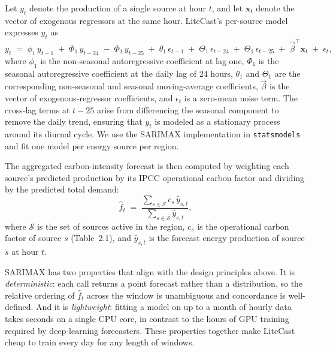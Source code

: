 Let $y_t$ denote the production of a single source at hour $t$, and let $\mathbf{x}_t$ denote the vector of exogenous regressors at the same hour.
LiteCast's per-source model expresses $y_t$ as
\begin{equation}
    y_t \;=\; \phi_1 \, y_{t-1} \;+\; \Phi_1 \, y_{t-24} \;-\; \Phi_1 \, y_{t-25} \;+\; \theta_1 \, \epsilon_{t-1} \;+\; \Theta_1 \, \epsilon_{t-24} \;+\; \Theta_1 \, \epsilon_{t-25} \;+\; \vec{\beta}^{\top} \mathbf{x}_t \;+\; \epsilon_t,
    \label{eq:method-sarimax}
\end{equation}
where $\phi_1$ is the non-seasonal autoregressive coefficient at lag one, $\Phi_1$ is the seasonal autoregressive coefficient at the daily lag of $24$ hours, $\theta_1$ and $\Theta_1$ are the corresponding non-seasonal and seasonal moving-average coefficients, $\vec{\beta}$ is the vector of exogenous-regressor coefficients, and $\epsilon_t$ is a zero-mean noise term.
The cross-lag terms at $t-25$ arise from differencing the seasonal component to remove the daily trend, ensuring that $y_t$ is modeled as a stationary process around its diurnal cycle.
We use the SARIMAX implementation in \texttt{statsmodels} \cite{statsmodels} and fit one model per energy source per region.

The aggregated carbon-intensity forecast is then computed by weighting each source's predicted production by its IPCC operational carbon factor and dividing by the predicted total demand:
\begin{equation}
    \hat{f}_t \;=\; \frac{\sum_{s \in \mathcal{S}} c_s \, \hat{y}_{s,t}}{\sum_{s \in \mathcal{S}} \hat{y}_{s,t}},
    \label{eq:method-aggregation}
\end{equation}
where $\mathcal{S}$ is the set of sources active in the region, $c_s$ is the operational carbon factor of source $s$ (Table~2.1), and $\hat{y}_{s,t}$ is the forecast energy production of source $s$ at hour $t$.

SARIMAX has two properties that align with the design principles above.
It is \textit{deterministic}: each call returns a point forecast rather than a distribution, so the relative ordering of $\hat{f}_t$ across the window is unambiguous and concordance is well-defined.
And it is \textit{lightweight}: fitting a model on up to a month of hourly data takes seconds on a single CPU core, in contrast to the hours of GPU training required by deep-learning forecasters.
These properties together make LiteCast cheap to train every day for any length of windows.


